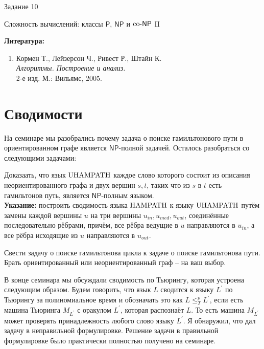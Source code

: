 \documentclass[12pt, leqno]{article}
\theoremstyle{definiton}
\theoremstyle{definition}
\theoremstyle{definition}
\let\leq\leqslant
\def\PP{{\mathsf{P}}}
\def\NP{{\mathsf{NP}}}
\def\coNP{{\rm co}\text{-}{\mathsf{NP}}}
\newcounter{problem}
\newcounter{subproblem}
\def\prp{\medskip\noindent\stepcounter{problem}{\bf Задача \theproblem .  }\setcounter{subproblem}{0} }
\begin{document}
\centerline{\LARGE Задание 10}

\medskip

\begin{center}
	{\Large Сложность вычислений: классы $\PP$, $\NP$ и $\coNP$ II}
\end{center}

\bigskip

{\bf Литература: }
\begin{enumerate}

\item Кормен Т., Лейзерсон Ч., Ривест Р., Штайн К. \\ {\it Алгоритмы. Построение и анализ. }\\  2-е изд. М.: Вильямс, 2005.

\end{enumerate}

	


\section{Сводимости}

На семинаре мы разобрались почему задача о поиске гамильтонового пути в ориентированном графе является $\NP$-полной задачей. Осталось разобраться со следующими задачами:

\prp Доказаать, что язык $\rm{UHAMPATH}$ каждое слово которого состоит из описания неориентированного графа и двух вершин $s,t$, таких что из $s$ в $t$ есть гамильтонов путь, является $\NP$-полным языком.\\
\smallskip
\textbf{Указание:} построить сводимость языка $\rm{HAMPATH}$ к языку $\rm{UHAMPATH}$ путём замены каждой вершины $u$ на три вершины $u_{in},u_{med},u_{out}$, соединённые последовательно рёбрами, причём, все рёбра ведущие в $u$ направляются в $u_{in}$, а все рёбра исходящие из $u$ направляются в $u_{out}$.

\prp Свести задачу о поиске гамильтонова цикла к задаче о поиске гамильтонова пути. Брать ориентированный или неориентированный граф -- на ваш выбор.
\bigskip

В конце семинара мы обсуждали сводимость по Тьюрингу, которая устроена следующим образом. Будем говорить, что язык $L$ сводится к языку $L^\prime$ по Тьюрингу за полиномиальное время и обозначать это как $L \leq^p_T L^\prime$, если есть машина Тьюринга $M_{L^\prime}$ с оракулом $L^\prime$, которая распознаёт $L$. То есть машина $M_{L^\prime}$ может проверять принадлежность любого слово языку $L^\prime$. Я обнаружил, что дал задачу в неправильной формулировке. Решение задачи в правильной формулировке было практически полностью получено на семинаре.
\end{document}
